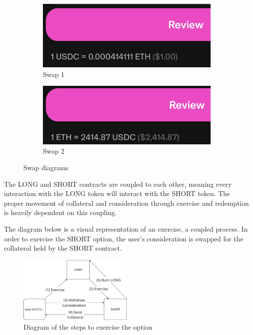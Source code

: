 \documentclass[%
 reprint,
 amsmath,amssymb,
 aps,
]{revtex4-2}
\begin{document}
\begin{figure}[h]
  \centering
  \begin{subfigure}[b]{0.45\textwidth}
    \includegraphics[width=\textwidth]{swap1.png}
    \caption{Swap 1}
    \label{fig:swap1}
  \end{subfigure}
  \hfill
  \begin{subfigure}[b]{0.45\textwidth}
    \includegraphics[width=\textwidth]{swap2.png}
    \caption{Swap 2}
    \label{fig:swap2}
  \end{subfigure}
  \caption{Swap diagrams}
  \label{fig:swaps}
\end{figure}


The LONG and SHORT contracts are coupled to each other, meaning every interaction with the LONG token will interact with the SHORT token.
The proper movement of collateral and consideration through exercise and redemption is heavily dependent on this coupling.

The diagram below is a visual representation of an exercise, a coupled process. 
In order to exercise the SHORT option, the user's consideration is swapped for the collateral held by the SHORT contract.
\begin{figure}[h]
  \centering
  \includegraphics[width=0.5\textwidth]{exercise.png}
  \caption{Diagram of the steps to exercise the option}
  \label{fig:exercise}
\end{figure}
\end{document}
